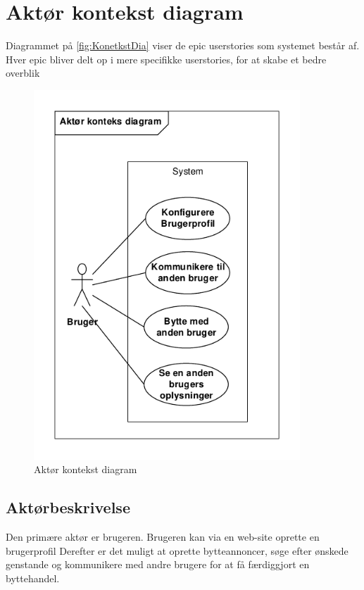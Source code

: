 \section{Aktør kontekst diagram}
Diagrammet på \ref{fig:KonetkstDia} viser de epic userstories som systemet består af. Hver epic bliver delt op i mere specifikke userstories, for at skabe et bedre overblik

\begin{figure}[H]
	\includegraphics[trim = 6mm 6mm 6mm 6mm, clip, width=100mm]{figures/KontekstDiagram.PDF}
	\caption{Aktør kontekst diagram}
	\label{fig:KontekstDia}
\end{figure}

\subsection{Aktørbeskrivelse}
Den primære aktør er brugeren. Brugeren kan via en web-site oprette en brugerprofil Derefter er det muligt at oprette bytteannoncer, søge efter ønskede genstande og kommunikere med andre brugere for at få færdiggjort en byttehandel.